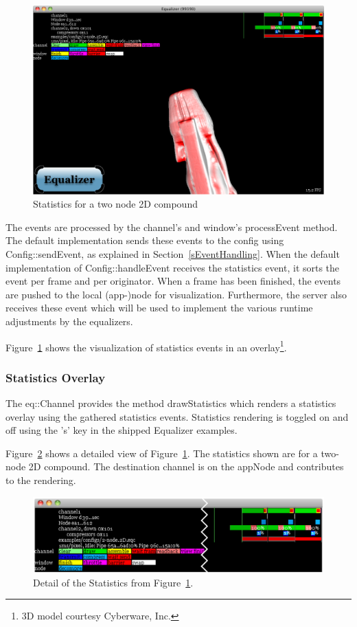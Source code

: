 \documentclass[10pt,a4]{scrartcl}
\newcommand{\fig}[1]{Figure~\ref{#1}}
\newcommand{\sref}[1]{Section~\ref{#1}}
\begin{document}
\begin{figure}
  \includegraphics[width=.618\textwidth]{images/statistics}
  {\caption{\label{fStatistics}Statistics for a two node 2D compound}}
\end{figure}
The events are processed by the channel's and window's \textsf{processEvent}
method. The default implementation sends these events to the config using
\textsf{Config::sendEvent}, as explained in \sref{sEventHandling}. When the
default implementation of \textsf{Config::handleEvent} receives the statistics
event, it sorts the event per frame and per originator. When a frame has been
finished, the events are pushed to the local (app-)node for
visualization. Furthermore, the server also receives these event which will be
used to implement the various runtime adjustments by the equalizers.

\fig{fStatistics} shows the visualization of statistics events in an
overlay\footnote{3D model courtesy Cyberware, Inc.}.

\subsubsection{\label{sStatisticsOverlay}Statistics Overlay}

The \textsf{eq::Channel} provides the method \textsf{drawStatistics} which
renders a statistics overlay using the gathered statistics events. Statistics
rendering is toggled on and off using the 's' key in the shipped Equalizer
examples.

\fig{fStatisticsDetail} shows a detailed view of \fig{fStatistics}. The
statistics shown are for a two-node 2D compound. The destination channel
is on the \textsf{appNode} and contributes to the rendering.

\begin{figure}[h!t]
  \includegraphics[width=\textwidth]{images/statisticsDetail}
  {\caption{\label{fStatisticsDetail}Detail of the Statistics from
      \fig{fStatistics}.}}
\end{figure}
\end{document}
